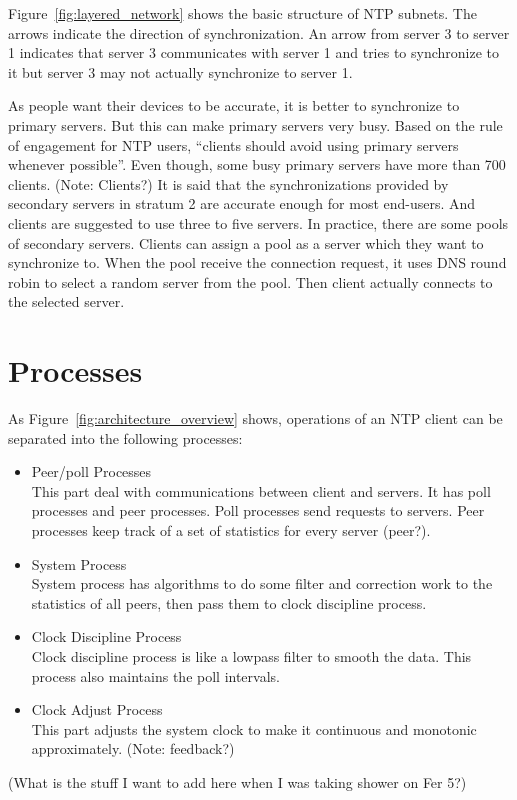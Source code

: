 Figure~\ref{fig:layered_network} shows the basic structure of NTP subnets. The
arrows indicate the direction of synchronization. An arrow from server 3 to
server 1 indicates that server 3 communicates with server 1 and tries to
synchronize to it but server 3 may not actually synchronize to server 1.



As people want their devices to be accurate, it is better to synchronize to
primary servers. But this can make primary servers very busy. Based on the rule
of engagement for NTP users, ``clients should avoid using primary servers
whenever possible''. Even though, some busy primary servers have more than 700
clients. (Note: Clients?)
It is said that the synchronizations provided by secondary servers in stratum 2
are accurate enough for most end-users. And clients are suggested to use three
to five servers. In practice, there are some pools of secondary servers.
Clients can assign a pool as a server which they want to synchronize to. When
the pool receive the connection request, it uses DNS round robin to select a
random server from the pool. Then client actually connects to the selected
server.

\section{Processes}
\label{sec:processes}
As Figure~\ref{fig:architecture_overview} shows, operations of an NTP client
can be separated into the following processes:
\begin{itemize}
    \item Peer/poll Processes\\
        This part deal with communications between client and servers. It has
        poll processes and peer processes. Poll processes send requests to
        servers. Peer processes keep track of a set of statistics for every
        server (peer?). 
    \item System Process\\
        System process has algorithms to do some filter and correction work to
        the statistics of all peers, then pass them to clock discipline
        process.
    \item Clock Discipline Process\\
        Clock discipline process is like a lowpass filter to smooth the data.
        This process also maintains the poll intervals.
    \item Clock Adjust Process\\
        This part adjusts the system clock to make it continuous and monotonic
        approximately. (Note: feedback?)
\end{itemize}



(What is the stuff I want to add here when I was taking shower on Fer 5?)

